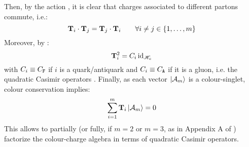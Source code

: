 Then, by the action , it is clear that charges associated to different partons commute, i.e.:
\begin{equation}
  \mathbf{T}_i \cdot \mathbf{T}_j = \mathbf{T}_j \cdot \mathbf{T}_i
  \qquad
  \forall i \neq j \in \{1, \dots, m\}
\end{equation}
Moreover, by :
\begin{equation}
  \mathbf{T}_i^2 = C_i \operatorname{id}_{\mathscr{H}_c}
\end{equation}
with $ C_i \equiv C_\mathtt{F} $ if $ i $ is a quark/antiquark and $ C_i \equiv C_\mathtt{A} $ if it is a gluon, i.e. the quadratic Casimir operators . Finally, as each vector $ \ket{\mathcal{A}_m} $ is a colour-singlet, colour conservation implies:
\begin{equation}
  \sum_{i = 1}^{m} \mathbf{T}_i \ket{\mathcal{A}_m} = 0
\end{equation}
This allows to partially (or fully, if $ m = 2 $ or $ m = 3 $, as in Appendix A of \cite{Catani-1997}) factorize the colour-charge algebra in terms of quadratic Casimir operators.










